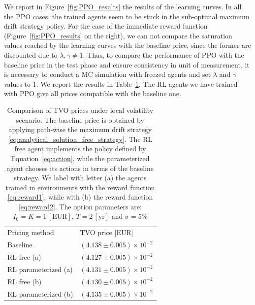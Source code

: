 \documentclass[runningheads]{m2ef}
\begin{document}
	We report in Figure~\ref{fig:PPO_results} the results of the learning curves. In all the PPO cases, the trained agents seem to be stuck in the sub-optimal maximum drift strategy policy. For the case of the immediate reward function (Figure~\ref{fig:PPO_results} on the right), we can not compare the saturation values reached by the learning curves with the baseline price, since the former are discounted due to $\lambda,\gamma \neq 1$.
	Thus, to compare the performance of PPO with the baseline price in the test phase and ensure consistency in unit of measurement, it is necessary to conduct a MC simulation with freezed agents and set $\lambda$ and $\gamma$ values to 1. We report the results in Table~\ref{tab:mc_results_lv}. The RL agents we have trained with PPO give all prices compatible with the baseline one.

	\begin{table}
	\begin{center}
	\caption{Comparison of TVO prices under local volatility scenario. The baseline price is obtained by applying path-wise the maximum drift strategy \eqref{eq:analytical_solution_free_strategy}. The RL free agent implements the policy defined by Equation~\eqref{eq:action}, while the parameterized agent chooses its actions in terms of the baseline strategy. We label with letter (a) the agents trained in environments with the reward function \eqref{eq:reward1}, while with (b) the reward function \eqref{eq:reward2}. The option parameters are: $I_0=K=1\,[\text{EUR}]$, $T=2\,[\text{yr}]$ and $\bar{\sigma}=5\%$}
	\label{tab:mc_results_lv}
	\begin{tabular}{ll}
	\hline\noalign{\smallskip}
	Pricing method & TVO price [EUR] \\
	\noalign{\smallskip}
	\hline
	\noalign{\smallskip}
	Baseline &  $(4.138 \pm 0.005)\times 10^{-2}$\\
	RL free (a) & $(4.127 \pm 0.005) \times 10^{-2}$ \\
	RL parameterized (a) & $(4.131 \pm 0.005) \times 10^{-2}$ \\
	RL free (b) & $(4.130 \pm 0.005) \times 10^{-2}$ \\
	RL parameterized (b) & $(4.135 \pm 0.005) \times 10^{-2}$ \\
	\hline
	\end{tabular}
	\end{center}
	\end{table}
	\setlength{\tabcolsep}{1.4pt}

\cleardoublepage
\end{document}
